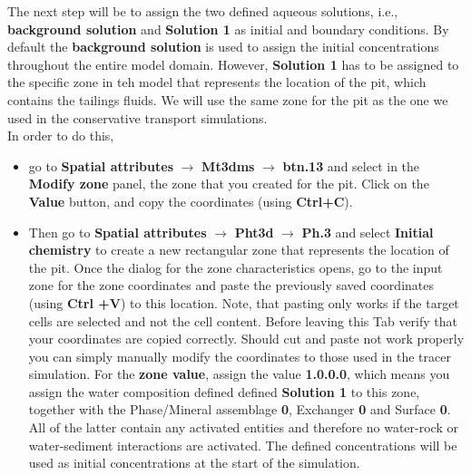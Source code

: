 The next step will be to assign the two defined aqueous solutions, 
i.e., {\color{blue}\textbf{background solution}} 
and {\color{blue}\textbf{Solution 1}}
as initial and boundary conditions. 
By default the {\color{blue}\textbf{background solution}} is used to
assign the initial concentrations throughout the entire model domain.
However, {\color{blue}\textbf{Solution 1}} has to be assigned 
to the specific zone in teh model that represents 
the location of the pit, which contains 
the tailings fluids. 
We will use the same zone for the pit as the one we used in 
the conservative transport simulations. 
\\
In order to do this, 
\begin{itemize}
\item go to 
{\color{blue}\textbf{Spatial attributes}} 
$\rightarrow$ {\color{blue}\textbf{Mt3dms}}
$\rightarrow$ {\color{blue}\textbf{btn.13}} 
and select in the 
{\color{blue}\textbf{Modify zone}} panel, 
the zone that you created for the pit. 
Click on the {\color{blue}\textbf{Value}} button, 
and copy the coordinates 
(using {\color{blue}\textbf{Ctrl+C}}). 
\item Then go to 
{\color{blue}\textbf{Spatial attributes}} 
$\rightarrow$ {\color{blue}\textbf{Pht3d}}
$\rightarrow$ {\color{blue}\textbf{Ph.3}}
and select {\color{blue}\textbf{Initial chemistry}} 
to create a new rectangular zone that represents
the location of the pit. 
Once the dialog for the zone characteristics opens, 
go to the input zone for the zone coordinates 
and paste the previously saved 
coordinates (using {\color{blue}\textbf{Ctrl +V}}) 
to this location. 
Note, that pasting only works if the target cells are 
selected and not the cell content. Before leaving this Tab 
verify that your coordinates are copied correctly. 
Should cut and paste not work properly you can simply manually
modify the coordinates to those used in the tracer simulation. 
For the {\color{blue}\textbf{zone value}}, 
assign the value {\color{blue}\textbf{1.0.0.0}}, 
which means you assign the water composition
defined defined {\color{blue}\textbf{Solution 1}} to this zone, together with
the Phase/Mineral assemblage {\color{blue}\textbf{0}}, 
Exchanger {\color{blue}\textbf{0}}
and Surface {\color{blue}\textbf{0}}. 
All of the latter contain any activated 
entities and therefore no water-rock or water-sediment interactions 
are activated.   
The defined concentrations will be used as initial concentrations 
at the start of the simulation.
\end{itemize}


